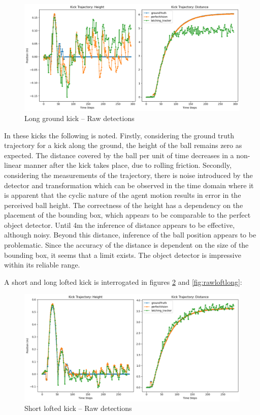 \documentclass[a4paper,twoside,12pt]{report}
\begin{document}
\begin{figure}[h!]
\begin{center}
\includegraphics[width=14cm]{images/raw_ground_long.png}
\caption{Long ground kick -- Raw detections}
\label{fig:rawgroundlong}
\end{center}
\end{figure}

In these kicks the following is noted. Firstly, considering the ground truth trajectory for a kick along the ground, the height of the ball remains zero as expected. The distance covered by the ball per unit of time decreases in a non-linear manner after the kick takes place, due to rolling friction. Secondly, considering the measurements of the trajectory, there is noise introduced by the detector and transformation which can be observed in the time domain where it is apparent that the cyclic nature of the agent motion results in error in the perceived ball height. The correctness of the height has a dependency on the placement of the bounding box, which appears to be comparable to the perfect object detector. Until 4m the inference of distance appears to be effective, although noisy. Beyond this distance, inference of the ball position appears to be problematic. Since the accuracy of the distance is dependent on the size of the bounding box, it seems that a limit exists. The object detector is impressive within its reliable range.

A short and long lofted kick is interrogated in figures \ref{fig:rawloftshort} and \ref{fig:rawloftlong}:

\begin{figure}[h!]
\begin{center}
\includegraphics[width=14cm]{images/raw_loft_short.png}
\caption{Short lofted kick -- Raw detections}
\label{fig:rawloftshort}
\end{center}
\end{figure}
\end{document}
